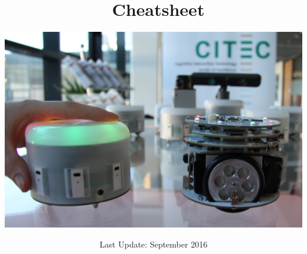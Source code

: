\title{\amiro\ Cheatsheet \\ }
\subtitle{\includegraphics[scale=0.3]{Bilder/AMiRos03.png}}
\date{Last Update: September 2016}

\maketitle

